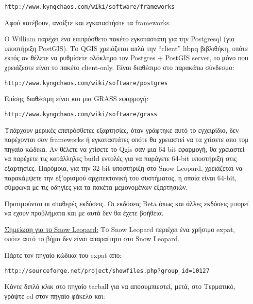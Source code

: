 \begin{verbatim}
http://www.kyngchaos.com/wiki/software/frameworks
\end{verbatim}

Αφού κατέβουν, ανοίξτε και εγκαταστήστε τα frameworks.

Ο William παρέχει ένα επιπρόσθετο πακέτο εγκαταστάτη για την Postgresql (για υποστήριξη PostGIS). Το QGIS χρειάζεται απλά την “client” libpq βιβλιθήκη, οπότε εκτός αν θέλετε να ρυθμίσετε ολόκληρο τον Postgres + PostGIS server, το μόνο που χρειάζεστε είναι το πακέτο client-only. Είναι διαθέσιμο στο παρακάτω σύνδεσμο:

\begin{verbatim}
http://www.kyngchaos.com/wiki/software/postgres 
\end{verbatim}

Επίσης διαθέσιμη είναι και μια GRASS εφαρμογή:

\begin{verbatim}
http://www.kyngchaos.com/wiki/software/grass
\end{verbatim}

Υπάρχουν μερικές επιπρόσθετες εξαρτησίες, όταν γράφτηκε αυτό το εγχειρίδιο, δεν παρέχονται σαν frameworks ή εγκαταστάτες οπότε θα χρειαστεί να τα χτίσετε απο τομ πηγαίο κώδικα. Αν θέλετε να χτίσετε το Qgis σαν μια 64-bit εφαρμογή, θα χρειαστεί να παρέχετε τις κατάλληλες build εντολές για να παράγετε 64-bit υποστήριξη στις εξαρτησίες. Παρόμοια, για την 32-bit υποστήριξη στο Snow Leopard, χρειάζεται να παρακάμψετε την εξ'ορισμού αρχιτεκτονική του συστήματος, η οποία είναι 64-bit, σύμφωνα με τις οδηγίες για τα πακέτα μεμονομένων εξαρτησιών.

Προτιμούνται οι σταθερές εκδόσεις. Οι εκδόσεις Beta όπως και άλλες εκδόσεις μπορεί να εχουν προβλήματα και με αυτά δεν θα έχετε βοήθεια.

\underline{Σημείωση για το Snow Leopard:} Το Snow Leopard περιέχει ένα χρήσιμο expat, οπότε αυτό το βήμα δεν είναι απαραίτητο στο Snow Leopard.

Πάρτε τον πηγαίο κώδικα του expat απο:

\begin{verbatim}
http://sourceforge.net/project/showfiles.php?group_id=10127 
\end{verbatim}

Κάντε διπλό κλικ στο πηγαίο tarball για να αποσυμπιεστεί, μετά, στο Τερματικό, γράψτε cd στον πηγαίο φάκελο και:

